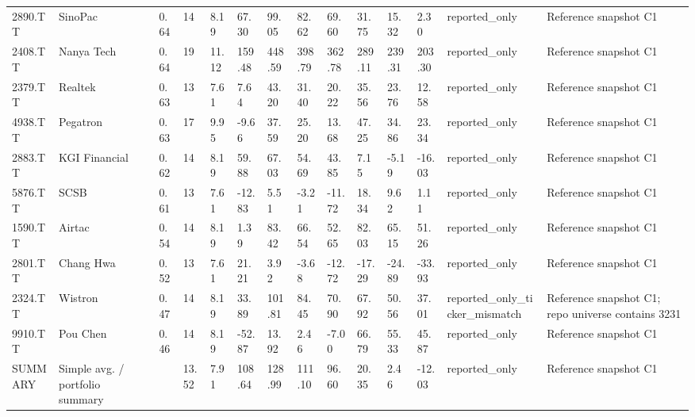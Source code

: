 \begin{landscape}
\begin{longtable}{llllllllllllll}
2890.TT & SinoPac & 0.64 & 14 & 8.19 & 67.30 & 99.05 & 82.62 & 69.60 & 31.75 & 15.32 & 2.30 & reported\_only & Reference snapshot C1 \\
2408.TT & Nanya Tech & 0.64 & 19 & 11.12 & 159.48 & 448.59 & 398.79 & 362.78 & 289.11 & 239.31 & 203.30 & reported\_only & Reference snapshot C1 \\
2379.TT & Realtek & 0.63 & 13 & 7.61 & 7.64 & 43.20 & 31.40 & 20.22 & 35.56 & 23.76 & 12.58 & reported\_only & Reference snapshot C1 \\
4938.TT & Pegatron & 0.63 & 17 & 9.95 & -9.66 & 37.59 & 25.20 & 13.68 & 47.25 & 34.86 & 23.34 & reported\_only & Reference snapshot C1 \\
2883.TT & KGI Financial & 0.62 & 14 & 8.19 & 59.88 & 67.03 & 54.69 & 43.85 & 7.15 & -5.19 & -16.03 & reported\_only & Reference snapshot C1 \\
5876.TT & SCSB & 0.61 & 13 & 7.61 & -12.83 & 5.51 & -3.21 & -11.72 & 18.34 & 9.62 & 1.11 & reported\_only & Reference snapshot C1 \\
1590.TT & Airtac & 0.54 & 14 & 8.19 & 1.39 & 83.42 & 66.54 & 52.65 & 82.03 & 65.15 & 51.26 & reported\_only & Reference snapshot C1 \\
2801.TT & Chang Hwa & 0.52 & 13 & 7.61 & 21.21 & 3.92 & -3.68 & -12.72 & -17.29 & -24.89 & -33.93 & reported\_only & Reference snapshot C1 \\
2324.TT & Wistron & 0.47 & 14 & 8.19 & 33.89 & 101.81 & 84.45 & 70.90 & 67.92 & 50.56 & 37.01 & reported\_only\_ticker\_mismatch & Reference snapshot C1; repo universe contains 3231 \\
9910.TT & Pou Chen & 0.46 & 14 & 8.19 & -52.87 & 13.92 & 2.46 & -7.00 & 66.79 & 55.33 & 45.87 & reported\_only & Reference snapshot C1 \\
SUMMARY & Simple avg. / portfolio summary &  & 13.52 & 7.91 & 108.64 & 128.99 & 111.10 & 96.60 & 20.35 & 2.46 & -12.03 & reported\_only & Reference snapshot C1 \\
\bottomrule
\end{longtable}
\end{landscape}
